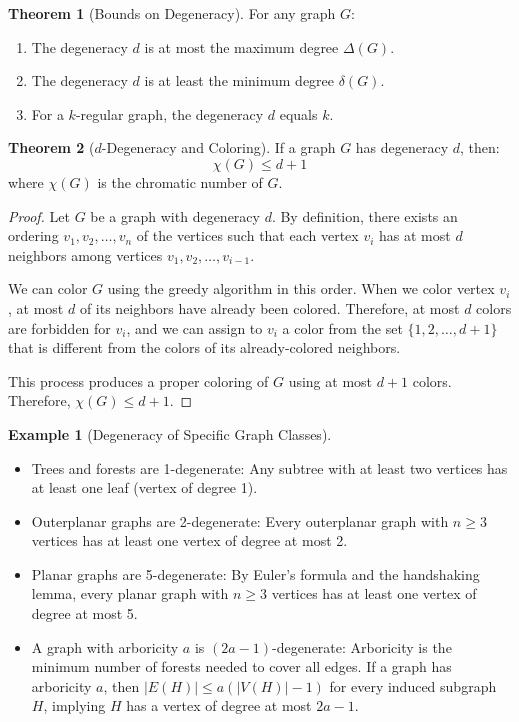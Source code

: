 \documentclass{article}
\theoremstyle{definition}
\newtheorem{example}{Example}
\newtheorem{theorem}{Theorem}
\begin{document}
\begin{theorem}[Bounds on Degeneracy]
For any graph $G$:
\begin{enumerate}
    \item The degeneracy $d$ is at most the maximum degree $\Delta(G)$.
    \item The degeneracy $d$ is at least the minimum degree $\delta(G)$.
    \item For a $k$-regular graph, the degeneracy $d$ equals $k$.
\end{enumerate}
\end{theorem}

\begin{theorem}[$d$-Degeneracy and Coloring]
If a graph $G$ has degeneracy $d$, then:
\begin{equation}
\chi(G) \leq d + 1
\end{equation}
where $\chi(G)$ is the chromatic number of $G$.
\end{theorem}

\begin{proof}
Let $G$ be a graph with degeneracy $d$. By definition, there exists an ordering $v_1, v_2, \ldots, v_n$ of the vertices such that each vertex $v_i$ has at most $d$ neighbors among vertices $v_1, v_2, \ldots, v_{i-1}$.

We can color $G$ using the greedy algorithm in this order. When we color vertex $v_i$, at most $d$ of its neighbors have already been colored. Therefore, at most $d$ colors are forbidden for $v_i$, and we can assign to $v_i$ a color from the set $\{1, 2, \ldots, d+1\}$ that is different from the colors of its already-colored neighbors.

This process produces a proper coloring of $G$ using at most $d+1$ colors. Therefore, $\chi(G) \leq d + 1$.
\end{proof}

\begin{example}[Degeneracy of Specific Graph Classes]
\begin{itemize}
    \item Trees and forests are 1-degenerate: Any subtree with at least two vertices has at least one leaf (vertex of degree 1).
    
    \item Outerplanar graphs are 2-degenerate: Every outerplanar graph with $n \geq 3$ vertices has at least one vertex of degree at most 2.
    
    \item Planar graphs are 5-degenerate: By Euler's formula and the handshaking lemma, every planar graph with $n \geq 3$ vertices has at least one vertex of degree at most 5.
    
    \item A graph with arboricity $a$ is $(2a-1)$-degenerate: Arboricity is the minimum number of forests needed to cover all edges. If a graph has arboricity $a$, then $|E(H)| \leq a(|V(H)|-1)$ for every induced subgraph $H$, implying $H$ has a vertex of degree at most $2a-1$.
\end{itemize}
\end{example}
\end{document}
